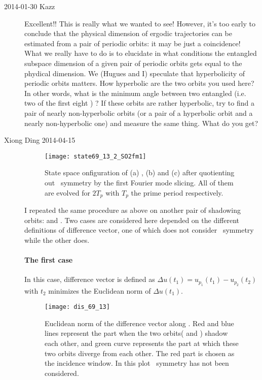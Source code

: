 \begin{description}

\item[2014-01-30 Kazz] Excellent!! This is really what we wanted to see! However, it's too early to conclude that the physical dimension of ergodic trajectories can be estimated from a pair of periodic orbits: it may be just a coincidence! What we really have to do is to elucidate in what conditions the entangled subspace dimension of a given pair of periodic orbits gets equal to the phydical dimension. We (Hugues and I) speculate that hyperbolicity of periodic orbits matters. How hyperbolic are the two orbits you used here? In other words, what is the minimum angle between two entangled {\cLvs} (i.e. two of the first eight {\cLvs}) ? If these orbits are rather hyperbolic, try to find a pair of nearly non-hyperbolic orbits (or a pair of a hyperbolic orbit and a nearly non-hyperbolic one) and measure the same thing. What do you get?



\item[Xiong Ding 2014-04-15]

  \begin{figure}[h]
    \centering
    \texttt{[image: state69\_13\_2\_SO2fm1]}
    \caption{State space onfiguration of (a) , (b)
       and (c)
       after quotienting out \ symmetry by the first
      Fourier mode slicing. All of them are evolved for $2T_{p}$ with $T_{p}$
      the prime period respectively.
    }
    \label{fig:state69_13_2_SO2fm1}
  \end{figure}

I repeated the same procedure as above on another pair of shadowing orbits:  and . Two cases are considered here depended
on the different definitions of difference vector, one of which does not
consider \ symmetry while the other does.

\paragraph{The first case}
In this case, difference vector is defined as
$\Delta u(t_1)= u_{p_1}(t_1)-u_{p_2}(t_2)$ with $t_2$ minimizes the
Euclidean norm of $\Delta u(t_1)$.

\begin{figure}[h]
  \centering
  \texttt{[image: dis\_69\_13]}
  \caption{Euclidean norm of the difference vector along .
    Red and blue lines represent the part when the two
    orbits( and ) shadow each other,
    and green curve represents the part at which these two orbits diverge
    from each other. The red part is chosen as the incidence window.
    In this plot \ symmetry has not been considered.
  }
  \label{fig:dis_69_13}
\end{figure}


\end{description}
